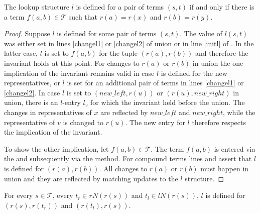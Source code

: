 \begin{invariant}[Lookup]

The lookup structure $l$ is defined for a pair of terms $(s,t)$ if and only if there is a term $f(a,b) \in \mathcal{T}$ such that $r(a) = r(x)$ and $r(b) = r(y)$.
\end{invariant}

\begin{proof}

Suppose $l$ is defined for some pair of terms $(s,t)$.
The value of $l(s,t)$ was either set in lines \ref{changel1} or \ref{changel2} of union or in line \ref{initl} of .
In the latter case, $l$ is set to $f(a,b)$ for the tuple $(r(a),r(b))$ and therefore the invariant holds at this point.
For changes to $r(a)$ or $r(b)$ in union the one implication of the invariant remains valid in case $l$ is defined for the new representatives, or $l$ is set for an additional pair of terms in lines \ref{changel1} or \ref{changel2}.
In case $l$ is set to $(new\_left,r(u))$ or $(r(u),new\_right)$ in union, there is an $l$-entry $l_v$ for which the invariant held before the union.
The changes in representatives of $x$ are reflected by $new\_left$ and $new\_right$, while the representative of $v$ is changed to $r(u)$.
The new entry for $l$ therefore respects the implication of the invariant.

To show the other implication, let $f(a,b) \in \mathcal{T}$.
The term $f(a,b)$ is entered via the  and subsequently via the  method.
For compound terms lines  and  assert that $l$ is defined for $(r(a),r(b))$.
All changes to $r(a)$ or $r(b)$ must happen in union and they are reflected by matching updates to the $l$ structure.

\end{proof}


\begin{invariant}[Neighbours]

For every $s \in \mathcal{T}$, every $t_r \in rN(r(s))$ and $t_l \in lN(r(s))$, $l$ is defined for $(r(s),r(t_r))$ and $(r(t_l),r(s))$.

\end{invariant}

